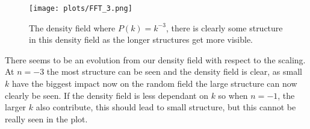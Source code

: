 \begin{figure}
   \centering
   \texttt{[image: plots/FFT\_3.png]}
      \caption{The density field where $P(k)=k^{-3}$, there is clearly some structure in this density field as the longer structures get more visible.}
\end{figure}

There seems to be an evolution from our density field with respect to the scaling. At $n=-3$ the most structure can be seen and the density field is clear, as small $k$ have the biggest impact now on the random field the large structure can now clearly be seen. If the density field is less dependant on $k$ so when $n=-1$, the larger $k$ also contribute, this should lead to small structure, but this cannot be really seen in the plot.
